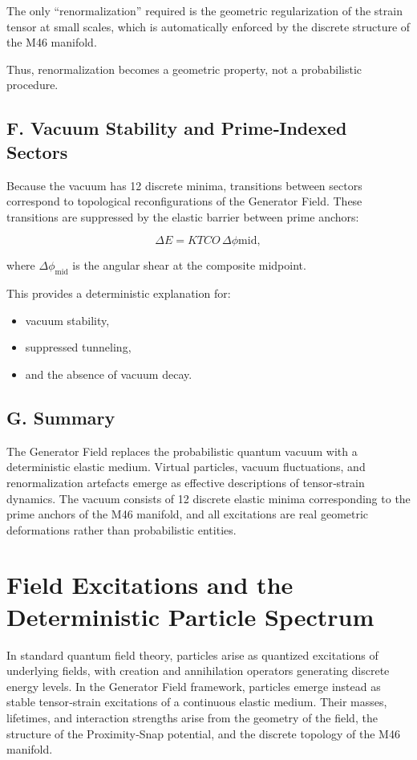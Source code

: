 \documentclass[reprint,amsmath,amssymb,aps,prl,floatfix]{revtex4-2}
\begin{document}
The only “renormalization” required is the geometric regularization of the strain tensor at small scales, which is automatically enforced by the discrete structure of the M46 manifold.
\medskip

Thus, renormalization becomes a geometric property, not a probabilistic procedure.

\subsection{F. Vacuum Stability and Prime‑Indexed Sectors}

Because the vacuum has 12 discrete minima, transitions between sectors correspond to topological reconfigurations of the Generator Field. These transitions are suppressed by the elastic barrier between prime anchors:

\[
\Delta E = K{TCO}\,\Delta\phi{\mathrm{mid}},
\]

where \(\Delta\phi_{\mathrm{mid}}\) is the angular shear at the composite midpoint.
\medskip

This provides a deterministic explanation for:
\begin{itemize}
\item vacuum stability,  
\item suppressed tunneling,  
\item and the absence of vacuum decay.
\end{itemize}

\subsection{G. Summary}

The Generator Field replaces the probabilistic quantum vacuum with a deterministic elastic medium. Virtual particles, vacuum fluctuations, and renormalization artefacts emerge as effective descriptions of tensor‑strain dynamics. The vacuum consists of 12 discrete elastic minima corresponding to the prime anchors of the M46 manifold, and all excitations are real geometric deformations rather than probabilistic entities.

\section{Field Excitations and the Deterministic Particle Spectrum}

In standard quantum field theory, particles arise as quantized excitations of underlying fields, with creation and annihilation operators generating discrete energy levels. In the Generator Field framework, particles emerge instead as stable tensor‑strain excitations of a continuous elastic medium. Their masses, lifetimes, and interaction strengths arise from the geometry of the field, the structure of the Proximity‑Snap potential, and the discrete topology of the M46 manifold.
\medskip
\end{document}
